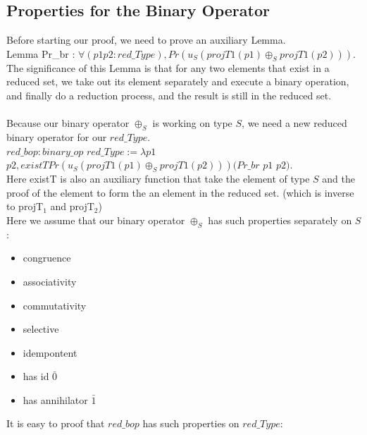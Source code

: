 \documentclass[a4paper,12pt,twoside,openright]{report}
\begin{document}
\subsection{Properties for the Binary Operator}
Before starting our proof, we need to prove an auxiliary Lemma.\\
Lemma Pr\_br : $\forall (p1 p2 : red\_Type), Pr (u_S(projT1 (p1) \oplus_S projT1 (p2))).$\\
The significance of this Lemma is that for any two elements that exist in a reduced set, we take out its element separately and execute a binary operation, and finally do a reduction process, and the result is still in the reduced set.\\\\
Because our binary operator $\oplus_S$ is working on type $S$, we need a new reduced binary operator for our $red\_Type$.\\
$red\_bop : binary\_op$ $red\_Type :=
    λ p1$ $p2,  existT Pr (u_S(projT1 (p1) \oplus_S projT1 (p2))) (Pr\_br$ $p1$ $p2).$\\
Here existT is also an auxiliary function that take the element of type $S$ and the proof of the element to form the an element in the reduced set. (which is inverse to projT$_1$ and projT$_2$)\\
Here we assume that our binary operator $\oplus_S$ has such properties separately on $S$:
\begin{itemize}
\item congruence 
\item associativity 
\item commutativity 
\item selective 
\item idempontent 
\item has id $\bar0$ 
\item has annihilator $\bar1$ 
\end{itemize}
It is easy to proof that $red\_bop$ has such properties on $red\_Type$:
\end{document}
